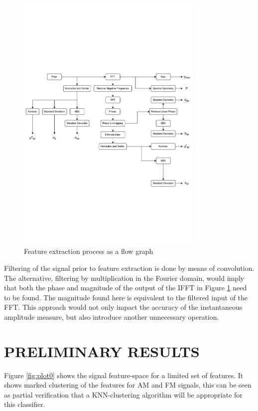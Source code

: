 \documentclass[10pt,twocolumn]{witseiepaper}
\begin{document}
\begin{figure}[h!]
	\centering
	\includegraphics[trim=0cm 10cm 0cm 11cm, clip=true,width=0.8\textwidth]{large.pdf}
	\caption{Feature extraction process as a flow graph}
	\label{fig:feature}
\end{figure}

Filtering of the signal prior to feature extraction is done by means of convolution. The alternative, filtering by multiplication in the Fourier domain, would imply that both the phase and magnitude of the output of the IFFT in Figure \ref{fig:feature} need to be found. The magnitude found here is equivalent to the filtered input of the FFT. This approach would not only impact the accuracy of the instantaneous amplitude measure, but also introduce another unnecessary operation.

\newpage
\section{PRELIMINARY RESULTS}
Figure \ref{fig:plot0} shows the signal feature-space for a limited set of features. It shows marked clustering of the features for AM and FM signals, this can be seen as partial verification that a KNN-clustering algorithm will be appropriate for this classifier.
\end{document}
